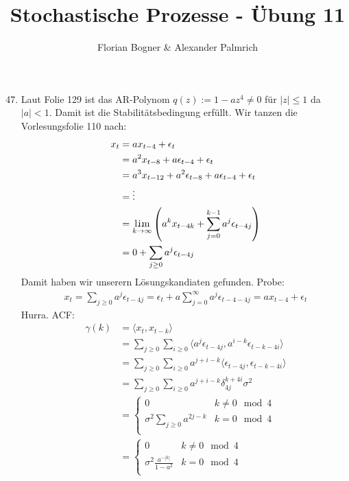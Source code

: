 \documentclass[a4paper,11pt,notitlepage,fullpage]{article}
\DeclareMathOperator*{\limm}{l.\hspace{-0.18em}i.\hspace{-0.19em}m}
\begin{document}
\author{Florian Bogner \& Alexander Palmrich}
\title{Stochastische Prozesse - Übung 11}
\maketitle

\begin{enumerate}
\setcounter{enumi}{46}


\item Laut Folie 129 ist das AR-Polynom $q(z) := 1 - a z^4 \neq 0$ für $|z| \leq 1$ da $|a| < 1$. Damit ist die Stabilitätsbedingung erfüllt. Wir tanzen die Vorlesungsfolie 110 nach: 
\begin{align*}
x_t &= a x_{t-4} + \epsilon_t \\
&= a^2 x_{t-8} + a \epsilon_{t-4} + \epsilon_t \\
&= a^3 x_{t-12}+ a^2 \epsilon_{t-8} + a \epsilon_{t-4} + \epsilon_t \\
&= \vdots \\
&= \limm_{k \to \infty}\left( a^k x_{t-4k} + \sum_{j=0}^{k-1}a^j \epsilon_{t-4j} \right) \\
&= 0 + \sum_{j\geq0} a^j \epsilon_{t-4j}
\end{align*}
Damit haben wir unserern Lösungskandiaten gefunden. Probe:
\begin{align*}
x_t = \sum_{j\geq0} a^j \epsilon_{t-4j} = \epsilon_t + a\sum_{j=0}^{\infty} a^j \epsilon_{t-4-4j} = a x_{t-4} + \epsilon_t
\end{align*}
Hurra. ACF:
\begin{align*}
\gamma(k) &= \langle x_t, x_{t-k} \rangle \\
&= \sum_{j\geq0} \sum_{i\geq0} \langle a^j \epsilon_{t - 4j}, a^{i-k} \epsilon_{t - k - 4i}\rangle \\
&= \sum_{j\geq0} \sum_{i\geq0} a^{j+i-k} \langle \epsilon_{t - 4j}, \epsilon_{t - k - 4i}\rangle \\
&= \sum_{j\geq0} \sum_{i\geq0} a^{j+i-k} \delta_{4j}^{k+4i} \sigma^2 \\
&= \begin{cases}
0 & k \neq 0 \mod 4 \\
\sigma^2 \sum_{j\geq0} a^{2j-k} & k = 0 \mod 4 \\
\end{cases} \\
&= \begin{cases}
0 & k \neq 0 \mod 4 \\
\sigma^2 \frac{a^{-|k|}}{1 - a^2} & k = 0 \mod 4 \\
\end{cases} \\
\end{align*}




\end{enumerate}
\end{document}
